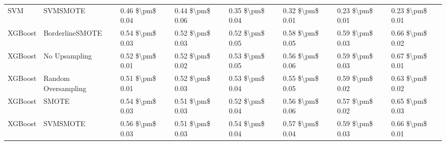 \begin{tabular}{llllllll}
                            SVM &                      SVMSMOTE & 0.46 \$\textbackslash pm\$ 0.04 &           0.44 \$\textbackslash pm\$ 0.06 &       0.35 \$\textbackslash pm\$ 0.04 &        0.32 \$\textbackslash pm\$ 0.01 &                         0.23 \$\textbackslash pm\$ 0.01 &     0.23 \$\textbackslash pm\$ 0.01 \\
                        XGBoost &               BorderlineSMOTE & 0.54 \$\textbackslash pm\$ 0.03 &           0.52 \$\textbackslash pm\$ 0.03 &       0.52 \$\textbackslash pm\$ 0.05 &        0.58 \$\textbackslash pm\$ 0.05 &                         0.59 \$\textbackslash pm\$ 0.03 &     0.66 \$\textbackslash pm\$ 0.02 \\
                        XGBoost &                 No Upsampling & 0.52 \$\textbackslash pm\$ 0.01 &           0.52 \$\textbackslash pm\$ 0.02 &       0.53 \$\textbackslash pm\$ 0.05 &        0.56 \$\textbackslash pm\$ 0.06 &                         0.59 \$\textbackslash pm\$ 0.03 &     0.67 \$\textbackslash pm\$ 0.01 \\
                        XGBoost &           Random Oversampling & 0.51 \$\textbackslash pm\$ 0.01 &           0.52 \$\textbackslash pm\$ 0.03 &       0.53 \$\textbackslash pm\$ 0.04 &        0.55 \$\textbackslash pm\$ 0.05 &                         0.59 \$\textbackslash pm\$ 0.02 &     0.63 \$\textbackslash pm\$ 0.02 \\
                        XGBoost &                         SMOTE & 0.54 \$\textbackslash pm\$ 0.03 &           0.51 \$\textbackslash pm\$ 0.03 &       0.52 \$\textbackslash pm\$ 0.04 &        0.56 \$\textbackslash pm\$ 0.06 &                         0.57 \$\textbackslash pm\$ 0.02 &     0.65 \$\textbackslash pm\$ 0.03 \\
                        XGBoost &                      SVMSMOTE & 0.56 \$\textbackslash pm\$ 0.03 &           0.51 \$\textbackslash pm\$ 0.03 &       0.54 \$\textbackslash pm\$ 0.04 &        0.57 \$\textbackslash pm\$ 0.04 &                         0.59 \$\textbackslash pm\$ 0.03 &     0.66 \$\textbackslash pm\$ 0.01 \\
\bottomrule
\end{tabular}
